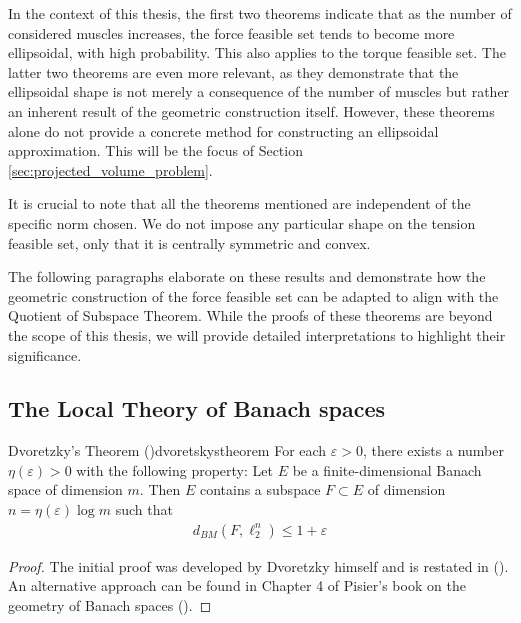 In the context of this thesis, the first two theorems indicate that as the number of considered muscles increases, the force feasible set tends to become more ellipsoidal, with high probability. This also applies to the torque feasible set. The latter two theorems are even more relevant, as they demonstrate that the ellipsoidal shape is not merely a consequence of the number of muscles but rather an inherent result of the geometric construction itself. However, these theorems alone do not provide a concrete method for constructing an ellipsoidal approximation. This will be the focus of Section \ref{sec:projected_volume_problem}.

It is crucial to note that all the theorems mentioned are independent of the specific norm chosen. We do not impose any particular shape on the tension feasible set, only that it is centrally symmetric and convex.

The following paragraphs elaborate on these results and demonstrate how the geometric construction of the force feasible set can be adapted to align with the Quotient of Subspace Theorem. While the proofs of these theorems are beyond the scope of this thesis, we will provide detailed interpretations to highlight their significance.

\subsection{The Local Theory of Banach spaces}
\label{subsec:theoretical_results_local_theory}

\begin{theorembox}{Dvoretzky's Theorem (\cite{dvoretzkyTHEOREMCONVEXBODIES1961})}{dvoretskystheorem}
    For each $\varepsilon > 0$, there exists a number $\eta(\varepsilon)>0$ with the following property: Let $E$ be a finite-dimensional Banach space of dimension $m$. Then $E$ contains a subspace $F\subset E$ of dimension $n=\eta(\varepsilon)\log m$ such that 
        \begin{align*}
        d_{BM}(F, \ell_2^n) \leq 1+\varepsilon
        \end{align*}
\end{theorembox}
\begin{proof}
    The initial proof was developed by Dvoretzky himself and is restated in (\cite{milmanDvoretzkyTheoremThirtyYearsLater1992}). An alternative approach can be found in Chapter 4 of Pisier's book on the geometry of Banach spaces (\cite{pisierVolumeConvexBodies1989}).
\end{proof}

